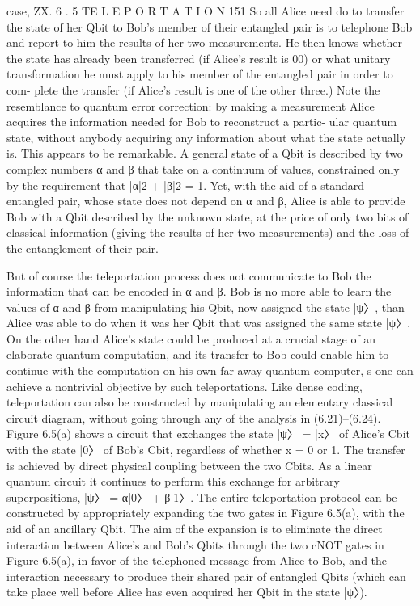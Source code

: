 \documentclass{book}
\begin{document}
case, ZX.
6 . 5 TE L E P O R T A T I O N 151
So all Alice need do to transfer the state of her Qbit to Bob’s member
of their entangled pair is to telephone Bob and report to him the results
of her two measurements. He then knows whether the state has already
been transferred (if Alice’s result is 00) or what unitary transformation
he must apply to his member of the entangled pair in order to com-
plete the transfer (if Alice’s result is one of the other three.) Note the
resemblance to quantum error correction: by making a measurement
Alice acquires the information needed for Bob to reconstruct a partic-
ular quantum state, without anybody acquiring any information about
what the state actually is.
This appears to be remarkable. A general state of a Qbit is described
by two complex numbers α and β that take on a continuum of values,
constrained only by the requirement that |α|2 + |β|2 = 1. Yet, with the
aid of a standard entangled pair, whose state does not depend on α and
β, Alice is able to provide Bob with a Qbit described by the unknown
state, at the price of only two bits of classical information (giving the
results of her two measurements) and the loss of the entanglement of their pair.






But of course the teleportation process does not communicate to Bob the information that can be encoded in α and β. Bob is no more able to learn the values of α and β from manipulating his Qbit, now assigned the state |ψ〉, than Alice was able to do when it was her Qbit that was assigned the same state |ψ〉. On the other hand Alice’s state could be produced at a crucial stage of an elaborate quantum computation, and its transfer to Bob could enable him to continue with the computation on his own far-away quantum computer, s  one can achieve a nontrivial objective by such teleportations. Like dense coding, teleportation can also be constructed by manipulating an elementary classical circuit diagram, without going through any of the analysis in (6.21)–(6.24). Figure 6.5(a) shows a circuit that exchanges the state |ψ〉 = |x〉 of Alice’s Cbit with the state |0〉 of Bob’s Cbit, regardless of whether x = 0 or 1. The transfer is achieved by direct physical coupling between the two Cbits. As a linear quantum circuit it continues to perform this exchange for arbitrary superpositions, |ψ〉 = α|0〉 + β|1〉. The entire teleportation protocol can be constructed by appropriately expanding the two gates in Figure 6.5(a), with the aid of an ancillary Qbit. The aim of the expansion is to eliminate the direct interaction between Alice’s and Bob’s Qbits through the two cNOT gates in Figure 6.5(a), in favor of the telephoned message from Alice to Bob, and the interaction necessary to produce their shared pair of entangled Qbits (which can take place well before Alice has even acquired her Qbit in the state |ψ〉).
\end{document}
